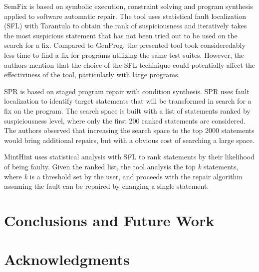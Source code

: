 \documentclass{article}
\begin{document}
SemFix is based on symbolic execution, constraint solving and program synthesis applied to software automatic repair. The tool uses statistical fault localization (SFL) with Tarantula to
obtain the rank of suspiciousness and iteratively takes the most suspicious statement that has not been tried out to be used on the search for a fix. Compared to GenProg, the presented tool
took consideredably less time to find a fix for programs utilizing the same test suites. However, the authors mention that the choice of the SFL techinique could potentially affect the
effectiviness of the tool, particularly with large programs.

SPR  is based on staged
program repair with condition synthesis. SPR uses fault localization
to identify target statements that will be transformed in search for a
fix on the program. The search space is built with a list of
statements ranked by suspiciousness level, where only the first 200
ranked statements are considered. The authors observed that increasing
the search space to the top 2000 statements would bring additional
repairs, but with a obvious cost of searching a large space.

MintHint  uses statistical analysis with SFL to rank
statements by their likelihood of being faulty. Given the ranked list,
the tool analysis the top \textit{k} statements, where \textit{k} is a
threshold set by the user, and proceeds with the repair algorithm
assuming the fault can be repaired by changing a single statement.






\section{Conclusions and Future Work}\label{sec:conc}
\section*{Acknowledgments}

{
  \small
  \balance
  
  
}
\end{document}
